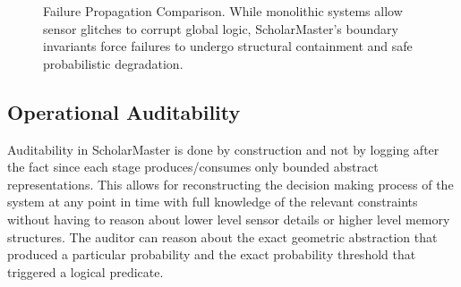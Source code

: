 \documentclass[conference]{IEEEtran}
\begin{document}
\begin{figure}[htbp]
\centering
{}
\caption{Failure Propagation Comparison. While monolithic systems allow sensor glitches to corrupt global logic, ScholarMaster's boundary invariants force failures to undergo structural containment and safe probabilistic degradation.}
\label{fig:propagation}
\end{figure}

\subsection{Operational Auditability}
Auditability in ScholarMaster is done by construction and not by logging after the fact since each stage produces/consumes only bounded abstract representations. This allows for reconstructing the decision making process of the system at any point in time with full knowledge of the relevant constraints without having to reason about lower level sensor details or higher level memory structures. The auditor can reason about the exact geometric abstraction that produced a particular probability and the exact probability threshold that triggered a logical predicate.
\end{document}
